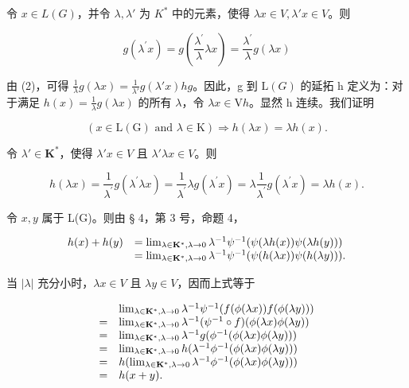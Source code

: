 令 \(x \in L(G)\)，并令 \(\lambda, \lambda'\) 为 \(K^*\) 中的元素，使得 \(\lambda x \in V, \lambda' x \in V\)。则

\[
g (\lambda^ {\prime} x) = g \left(\frac {\lambda^ {\prime}}{\lambda} \lambda x\right) = \frac {\lambda^ {\prime}}{\lambda} g (\lambda x)
\]

由 (2)，可得 \(\frac{1}{\lambda} g(\lambda x) = \frac{1}{\lambda'} g(\lambda' x)\)\(h\)\(g\)。因此，g 到 \(\mathrm{L}(G)\) 的延拓 h 定义为：对于满足 \(h(x) = \frac{1}{\lambda} g(\lambda x)\) 的所有 \(\lambda\)，令 \(\lambda x \in \mathrm{V}\)\(h\)。显然 h 连续。我们证明

\[
(x \in \mathrm{L} (\mathrm{G}) \text {   and   } \lambda \in \mathrm{K}) \Rightarrow h (\lambda x) = \lambda h (x).\tag{3}
\]

令 \(\lambda' \in \mathbf{K}^*\)，使得 \(\lambda' x \in V\) 且 \(\lambda' \lambda x \in V\)。则

\[
h (\lambda x) = \frac {1}{\lambda^ {\prime}} g \left(\lambda^ {\prime} \lambda x\right) = \frac {1}{\lambda^ {\prime}} \lambda g \left(\lambda^ {\prime} x\right) = \lambda \frac {1}{\lambda^ {\prime}} g \left(\lambda^ {\prime} x\right) = \lambda h (x).
\]

令 \(x, y\) 属于 L(G)。则由 § 4，第 3 号，命题 4，

\[
\begin{array}{r l} h (x) + h (y) & = \lim _ {\lambda \in \mathbf {K} ^ {*},   \lambda \to 0} \lambda^ {- 1} \psi^ {- 1} (\psi (\lambda h (x)) \psi (\lambda h (y))) \\ & = \lim _ {\lambda \in \mathbf {K} ^ {*},   \lambda \to 0} \lambda^ {- 1} \psi^ {- 1} (\psi (h (\lambda x)) \psi (h (\lambda y))). \end{array}
\]

当 \(|\lambda|\) 充分小时，\(\lambda x \in V\) 且 \(\lambda y \in V\)，因而上式等于

\[
\begin{array}{r l} & \lim _ {\lambda \in \mathbf {K} ^ {*}, \lambda \to 0} \lambda^ {- 1} \psi^ {- 1} (f (\phi (\lambda x)) f (\phi (\lambda y))) \\ = & \lim _ {\lambda \in \mathbf {K} ^ {*}, \lambda \to 0} \lambda^ {- 1} (\psi^ {- 1} \circ f) (\phi (\lambda x) \phi (\lambda y)) \\ = & \lim _ {\lambda \in \mathbf {K} ^ {*}, \lambda \to 0} \lambda^ {- 1} g (\phi^ {- 1} (\phi (\lambda x) \phi (\lambda y))) \\ = & \lim _ {\lambda \in \mathbf {K} ^ {*}, \lambda \to 0} h (\lambda^ {- 1} \phi^ {- 1} (\phi (\lambda x) \phi (\lambda y))) \\ = & h (\lim _ {\lambda \in \mathbf {K} ^ {*}, \lambda \to 0} \lambda^ {- 1} \phi^ {- 1} (\phi (\lambda x) \phi (\lambda y))) \\ = & h (x + y). \end{array}
\]

